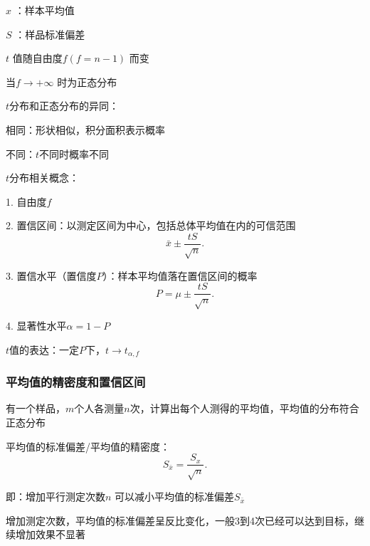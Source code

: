 $x$ ：样本平均值

$S$ ：样品标准偏差

$t$ 值随自由度$f\left( f=n-1 \right) $ 而变

当$f\to +\infty$ 时为正态分布
\begin{notation}
    $t$分布和正态分布的异同：

    相同：形状相似，积分面积表示概率

    不同：$t$不同时概率不同
\end{notation}
\begin{notation}
    $t$分布相关概念：

    1. 自由度$f$ 

    2. 置信区间：以测定区间为中心，包括总体平均值在内的可信范围\[
        \bar{x}\pm \frac{tS}{\sqrt{n} }
    .\]

    3. 置信水平（置信度$P$）：样本平均值落在置信区间的概率\[
        P = \mu\pm \frac{tS}{\sqrt{n} }
    .\]

    4. 显著性水平$\alpha=1-P$
\end{notation}
$t$值的表达：一定$P$下，$t\to t_{\alpha,f}$ 
\subsubsection{平均值的精密度和置信区间}%
\label{subsub:平均值的精密度和置信区间}
\begin{eg}
    有一个样品，$m$个人各测量$n$次，计算出每个人测得的平均值，平均值的分布符合正态分布
\end{eg}
平均值的标准偏差/平均值的精密度：
\[
    S_{\bar{x}}=\frac{S_{x}}{\sqrt{n} }
.\] 

即：增加平行测定次数$n$ 可以减小平均值的标准偏差$S_{\bar{x}}$ 
\begin{notation}
    增加测定次数，平均值的标准偏差呈反比变化，一般3到4次已经可以达到目标，继续增加效果不显著
\end{notation}
